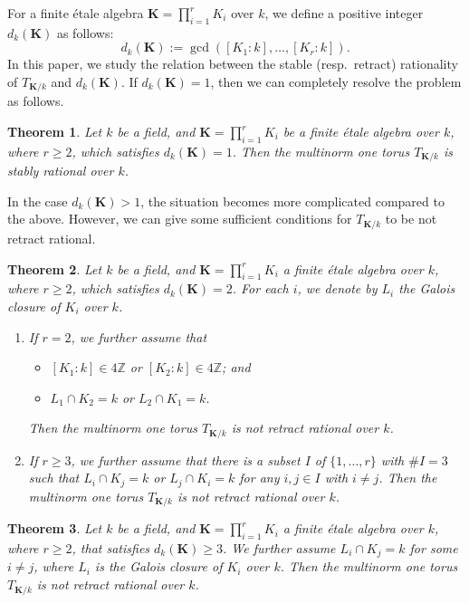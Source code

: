 \documentclass[12pt]{amsart}
\theoremstyle{plain}
\newtheorem{thm}{Theorem}[section]
\theoremstyle{definition}
\numberwithin{thm}{section}
\numberwithin{equation}{section}
\newcommand{\Z}{\mathbb{Z}}
\newcommand{\bK}{\mathbf{K}}
\begin{document}
For a finite {\'e}tale algebra $\bK=\prod_{i=1}^{r}K_{i}$ over $k$, we define a positive integer $d_{k}(\bK)$ as follows: 
\begin{equation*}
d_{k}(\bK):=\gcd([K_{1}:k],\ldots,[K_{r}:k]). 
\end{equation*}
In this paper, we study the relation between the stable (resp.~retract) rationality of $T_{\bK/k}$ and $d_{k}(\bK)$. 
If $d_{k}(\bK)=1$, then we can completely resolve the problem as follows.  

\begin{thm}\label{mtd1}
Let $k$ be a field, and $\bK=\prod_{i=1}^{r}K_{i}$ be a finite {\'e}tale algebra over $k$, where $r\geq 2$, which satisfies $d_{k}(\bK)=1$. Then the multinorm one torus $T_{\bK/k}$ is stably rational over $k$. 
\end{thm}

In the case $d_{k}(\bK)>1$, the situation becomes more complicated compared to the above. However, we can give some sufficient conditions for $T_{\bK/k}$ to be not retract rational. 

\begin{thm}\label{mtd2}
Let $k$ be a field, and $\bK=\prod_{i=1}^{r}K_{i}$ a finite {\'e}tale algebra over $k$, where $r\geq 2$, which satisfies $d_{k}(\bK)=2$. For each $i$, we denote by $L_{i}$ the Galois closure of $K_{i}$ over $k$. 
\begin{enumerate}
\item If $r=2$, we further assume that 
    \begin{itemize}
    \item $[K_{1}:k]\in 4\Z$ or $[K_{2}:k]\in 4\Z$; and 
    \item $L_{1}\cap K_{2}=k$ or $L_{2}\cap K_{1}=k$.
    \end{itemize}
Then the multinorm one torus $T_{\bK/k}$ is not retract rational over $k$. 
\item If $r\geq 3$, we further assume that there is a subset $I$ of $\{1,\ldots,r\}$ with $\#I=3$ such that $L_{i}\cap K_{j}=k$ or $L_{j}\cap K_{i}=k$ for any $i,j\in I$ with $i\neq j$. Then the multinorm one torus $T_{\bK/k}$ is not retract rational over $k$. 
\end{enumerate}
\end{thm}

\begin{thm}\label{mtd3}
Let $k$ be a field, and $\bK=\prod_{i=1}^{r}K_{i}$ a finite {\'e}tale algebra over $k$, where $r\geq 2$, that satisfies $d_{k}(\bK)\geq 3$. We further assume $L_{i}\cap K_{j}=k$ for some $i\neq j$, where $L_{i}$ is the Galois closure of $K_{i}$ over $k$. Then the multinorm one torus $T_{\bK/k}$ is not retract rational over $k$. 
\end{thm}
\end{document}
